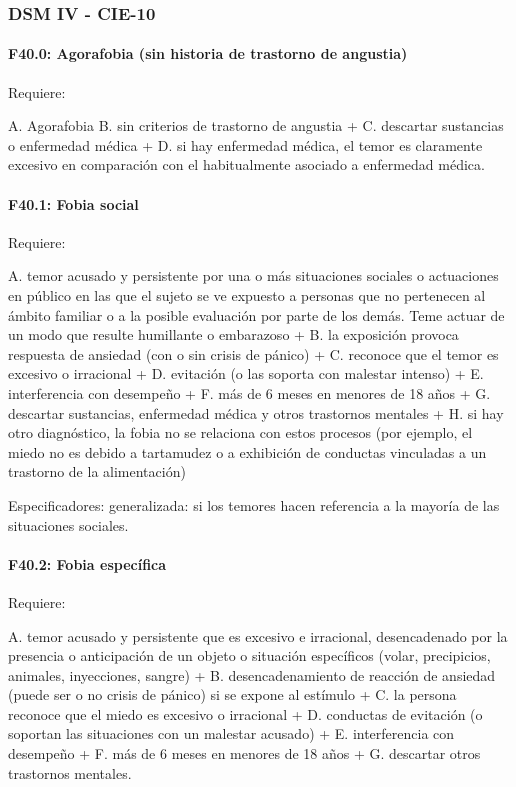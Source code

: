 \subsubsection*{DSM IV - CIE-10}
\paragraph{F40.0: Agorafobia (sin historia de trastorno de angustia)}
Requiere:

A. Agorafobia
B. sin criterios de trastorno de angustia +
C. descartar sustancias o enfermedad médica +
D. si hay enfermedad médica, el temor es claramente excesivo en comparación con el habitualmente asociado a enfermedad médica.

\paragraph{F40.1: Fobia social}
Requiere:

A. temor acusado y persistente por una o más situaciones sociales o actuaciones en público en las que el sujeto se ve expuesto a personas que no pertenecen al ámbito familiar o a la posible evaluación por parte de los demás. Teme actuar de un modo que resulte humillante o embarazoso +
B. la exposición provoca respuesta de ansiedad (con o sin crisis de pánico) +
C. reconoce que el temor es excesivo o irracional +
D. evitación (o las soporta con malestar intenso) +
E. interferencia con desempeño +
F. más de 6 meses en menores de 18 años +
G. descartar sustancias, enfermedad médica y otros trastornos mentales +
H. si hay otro diagnóstico, la fobia no se relaciona con estos procesos (por ejemplo, el miedo no es debido a tartamudez o a exhibición de conductas vinculadas a un trastorno de la alimentación)

Especificadores: generalizada: si los temores hacen referencia a la mayoría de las situaciones sociales.

\paragraph{F40.2: Fobia específica}
Requiere:

A. temor acusado y persistente que es excesivo e irracional, desencadenado por la presencia o anticipación de un objeto o situación específicos (volar, precipicios, animales, inyecciones, sangre) +
B. desencadenamiento de reacción de ansiedad (puede ser o no crisis de pánico) si se expone al estímulo +
C. la persona reconoce que el miedo es excesivo o irracional +
D. conductas de evitación (o soportan las situaciones con un malestar acusado) +
E. interferencia con desempeño +
F. más de 6 meses en menores de 18 años +
G. descartar otros trastornos mentales.

